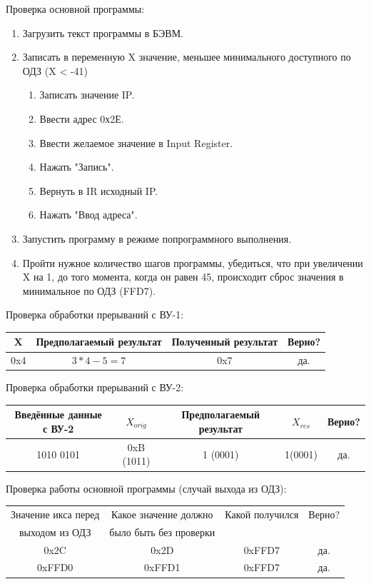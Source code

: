 Проверка основной программы:
\begin{enumerate}
    \item Загрузить текст программы в БЭВМ.
    \item Записать в переменную X значение, меньшее минимального доступного по ОДЗ (X < -41)
    \begin{enumerate}
        \item Записать значение IP.
        \item Ввести адрес 0х2Е.
        \item Ввести желаемое значение в Input Register.
        \item Нажать "Запись".
        \item Вернуть в IR исходный IP.
        \item Нажать "Ввод адреса".
    \end{enumerate}
    \item Запустить программу в режиме попрограммного выполнения.
    \item Пройти нужное количество шагов программы, убедиться, что при увеличении X на 1, до того момента, когда он равен 45, происходит сброс значения в
    минимальное по ОДЗ (FFD7).
\end{enumerate}

Проверка обработки прерываний с ВУ-1:
\begin{center}
    \begin{tabular}{|c|c|c|c|}
        \hline
        X   & Предполагаемый результат & Полученный результат & Верно? \\
        \hline
        0x4 & $3*4-5=7$                & 0x7                  & да.    \\
        \hline
    \end{tabular}
\end{center}
Проверка обработки прерываний с ВУ-2:
\begin{center}
    \begin{tabular}{|c|c|c|c|c|}
        \hline
        Введённые данные с ВУ-2 & $X_{orig}$ & Предполагаемый результат & $X_{res}$ & Верно? \\
        \hline
        1010 0101               & 0xB (1011) & 1 (0001)                 & 1(0001)   & да.    \\
        \hline
    \end{tabular}
\end{center}
Проверка работы основной программы (случай выхода из ОДЗ):
\begin{center}
    \begin{tabular}{|c|c|c|c|}
        \hline
        Значение икса перед & Какое значение должно  & Какой получился & Верно? \\
        выходом из ОДЗ      & было быть без проверки &                 &        \\
        \hline
        0x2C                & 0x2D                   & 0xFFD7          & да.    \\
        0xFFD0              & 0xFFD1                 & 0xFFD7          & да.    \\
        \hline
    \end{tabular}
\end{center}

